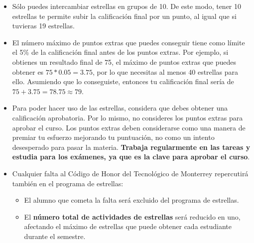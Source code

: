 \documentclass[12pt, letterpaper, oneside]{article}
\begin{document}
  \begin{itemize}
      \item Sólo puedes intercambiar estrellas en grupos de 10.
      De este modo, tener 10 estrellas te permite subir la calificación final por un punto, al igual que si tuvieras 19 estrellas.
      \item El número máximo de puntos extras que puedes conseguir tiene como límite el 5\% de la calificación final antes de los puntos extras.
      Por ejemplo, si obtienes un resultado final de 75, el máximo de puntos extras que puedes obtener es $75*0.05=3.75$, por lo que necesitas al menos 40 estrellas para ello.
      Asumiendo que lo conseguiste, entonces tu calificación final sería de $75 + 3.75 = 78.75 \approx 79$.
      \item Para poder hacer uso de las estrellas, considera que debes obtener una calificación aprobatoria.
      Por lo mismo, no consideres los puntos extras para aprobar el curso.
      Los puntos extras deben considerarse como una manera de premiar tu esfuerzo mejorando tu puntuación, no como un intento desesperado para pasar la materia.
      \textbf{Trabaja regularmente en las tareas y estudia para los exámenes, ya que es la clave para aprobar el curso}.
      \item Cualquier falta al Código de Honor del Tecnológico de Monterrey  repercutirá también en el programa de estrellas:
      \begin{itemize}
          \item El alumno que cometa la falta será excluido del programa de estrellas.
          \item El \textbf{número total de actividades de estrellas} será reducido en uno, afectando el máximo de estrellas que puede obtener cada estudiante durante el semestre.
      \end{itemize}
  \end{itemize}

\end{document}
